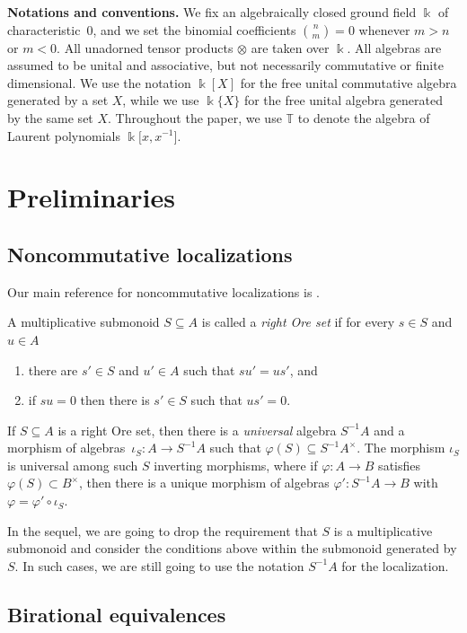 \documentclass[10pt,a4paper]{amsart}
\newcommand{\B}[1]{\mathbb{#1}}
\numberwithin{equation}{section}
\begin{document}
{\bf Notations and conventions.}
We fix an algebraically closed ground field $\Bbbk$ of characteristic~0, and we set the binomial
coefficients $\binom{n}{m}=0$ whenever $m>n$ or $m<0$. All unadorned tensor products $\otimes$ are
taken over $\Bbbk$. All algebras are assumed to be unital and associative, but not necessarily
commutative or finite dimensional. We use the notation $\Bbbk[X]$ for the free unital commutative
algebra generated by a set $X$, while we use $\Bbbk\{X\}$ for the free unital algebra generated by
the same set $X$. Throughout the paper, we use $\B{T}$ to denote the algebra of Laurent polynomials
$\Bbbk\big[x,x^{-1}\big]$.

\section{Preliminaries}\label{sect:prelims}

\subsection{Noncommutative localizations}

Our main reference for noncommutative localizations is \cite[Section~10]{Lam:Lectures}.

A multiplicative submonoid $S\subseteq A$ is called a \emph{right Ore set} if for every
$s\in S$ and $u\in A$
\begin{enumerate}\itemsep=0pt
\item[(i)] there are $s'\in S$ and $u'\in A$ such that $su'=us'$, and
\item[(ii)] if $su=0$ then there is $s'\in S$ such that $us'=0$.
\end{enumerate}

If $S\subseteq A$ is a right Ore set, then there is a \emph{universal} algebra $S^{-1}A$ and a
morphism of algebras~${\iota_S\colon A\to S^{-1}}A$ such that $\varphi(S)\subseteq S^{-1}A^\times$. The
morphism $\iota_S$ is universal among such $S$ inverting morphisms, where if $\varphi\colon A\to B$
satisfies $\varphi(S)\subset B^\times$, then there is a unique morphism of algebras
$\varphi'\colon S^{-1}A\to B$ with $\varphi = \varphi'\circ \iota_S$.

In the sequel, we are going to drop the requirement that $S$ is a multiplicative submonoid and
consider the conditions above within the submonoid generated by $S$. In such cases, we are still
going to use the notation $S^{-1}A$ for the localization.

\subsection{Birational equivalences}
\end{document}
